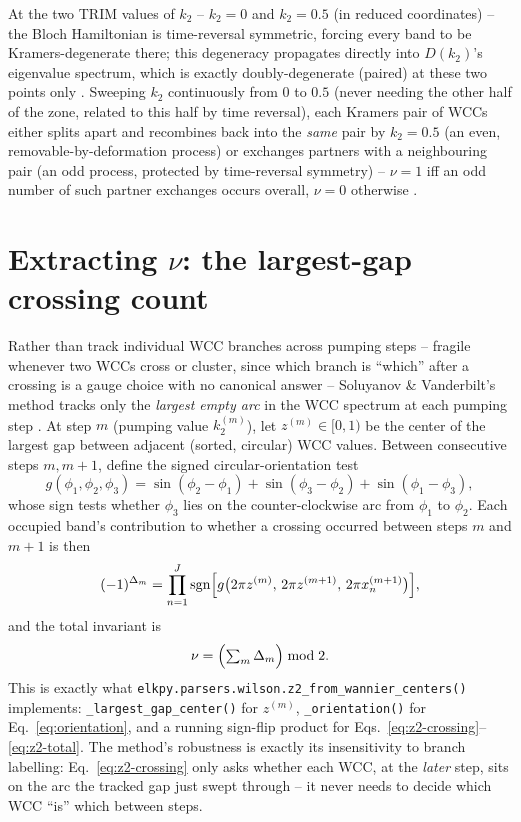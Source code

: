 \documentclass[11pt]{article}
\begin{document}
At the two TRIM values of $k_2$ -- $k_2=0$ and $k_2=0.5$ (in reduced coordinates) -- the
Bloch Hamiltonian is time-reversal symmetric, forcing every band to be Kramers-degenerate
there; this degeneracy propagates directly into $D(k_2)$'s eigenvalue spectrum, which is
exactly doubly-degenerate (paired) at these two points only \cite{yu2011}. Sweeping
$k_2$ continuously from $0$ to $0.5$ (never needing the other half of the zone, related to
this half by time reversal), each Kramers pair of WCCs either splits apart and
recombines back into the \emph{same} pair by $k_2=0.5$ (an even, removable-by-deformation
process) or exchanges partners with a neighbouring pair (an odd process, protected by
time-reversal symmetry) -- $\nu=1$ iff an odd number of such partner exchanges occurs
overall, $\nu=0$ otherwise \cite{yu2011,soluyanov2011}.

\section{Extracting $\nu$: the largest-gap crossing count}

Rather than track individual WCC branches across pumping steps -- fragile whenever two
WCCs cross or cluster, since which branch is ``which'' after a crossing is a gauge
choice with no canonical answer -- Soluyanov \& Vanderbilt's method tracks only the
\emph{largest empty arc} in the WCC spectrum at each pumping step \cite{soluyanov2011}.
At step $m$ (pumping value $k_2^{(m)}$), let $z^{(m)}\in[0,1)$ be the center of the
largest gap between adjacent (sorted, circular) WCC values. Between consecutive steps
$m,m+1$, define the signed circular-orientation test
\begin{equation}
  g(\phi_1,\phi_2,\phi_3) = \sin(\phi_2-\phi_1) + \sin(\phi_3-\phi_2) + \sin(\phi_1-\phi_3),
  \label{eq:orientation}
\end{equation}
whose sign tests whether $\phi_3$ lies on the counter-clockwise arc from $\phi_1$ to
$\phi_2$. Each occupied band's contribution to whether a crossing occurred between steps
$m$ and $m+1$ is then
\begin{equation}
  (-1)^{\Delta_m} = \prod_{n=1}^{J} \operatorname{sgn}\Bigl[
    g\bigl(2\pi z^{(m)},\,2\pi z^{(m+1)},\,2\pi x_n^{(m+1)}\bigr)\Bigr],
  \label{eq:z2-crossing}
\end{equation}
and the total invariant is
\begin{equation}
  \nu = \Bigl(\textstyle\sum_m \Delta_m\Bigr) \bmod 2.
  \label{eq:z2-total}
\end{equation}
This is exactly what \texttt{elkpy.parsers.wilson.z2\_from\_wannier\_centers()}
implements: \texttt{\_largest\_gap\_center()} for $z^{(m)}$,
\texttt{\_orientation()} for Eq.~\eqref{eq:orientation}, and a running sign-flip
product for Eqs.~\eqref{eq:z2-crossing}--\eqref{eq:z2-total}. The method's robustness
is exactly its insensitivity to branch labelling: Eq.~\eqref{eq:z2-crossing} only asks
whether each WCC, at the \emph{later} step, sits on the arc the tracked gap just swept
through -- it never needs to decide which WCC ``is'' which between steps.
\end{document}
